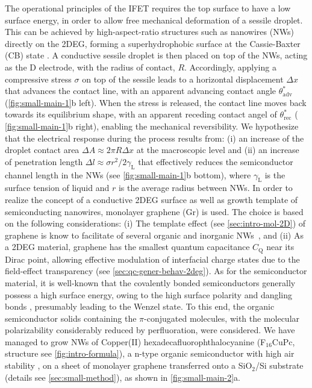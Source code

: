 The operational principles of the IFET requires the top surface to
have a low surface energy, in order to allow free mechanical
deformation of a sessile droplet.
%
This can be achieved by high-aspect-ratio structures such as nanowires (NWs)~\cite{Yang_2010_rev_NW} directly on the 2DEG,
forming a superhydrophobic surface at the Cassie-Baxter (CB) state
\cite{Cassie_1944_wet}.
%
A conductive sessile droplet is then placed on top
of the NWs, acting as the D electrode, with the radius of contact,
\(R\).
%
Accordingly, applying a compressive stress \(\sigma\) on top
of the sessile leads to a horizontal displacement \(\Delta x\) that
advances the contact line, with an apparent advancing contact angle
\(\theta_{\mathrm{adv}}^{*}\) (\autoref{fig:small-main-1}b left).
%
When the
stress is released, the contact line moves back towards its
equilibrium shape, with an apparent receding contact angel of
\(\theta_{\mathrm{rec}}^{*}\) ( \autoref{fig:small-main-1}b right), enabling the
mechanical reversibility.
%
We hypothesize that the electrical response during the
process results from: (i) an increase of the droplet contact area
\(\Delta A \approx 2 \pi R \Delta x\) at the macroscopic level and (ii)
an increase of penetration length \(\Delta l \approx \sigma
r^{2}/2\gamma_{\mathrm{L}}\) that effectively reduces the semiconductor
channel length in the NWs (see  \autoref{fig:small-main-1}b bottom), where
\(\gamma_{\mathrm{L}}\) is the surface tension of liquid and \(r\) is the
average radius between NWs.
%
In order to realize the concept of a conductive 2DEG surface as well
as growth template of semiconducting nanowires, monolayer graphene (Gr) is used.
%
The choice is based on the following considerations: (i) The template
effect (see \autoref{sec:intro-mol-2D}) of graphene is know to
facilitate of several organic and inorganic
NWs~\cite{Huang_2016_laury_nanowire_gr,Wang_2015_vertical_nanowire_gr,Fu_2012_gr_ZnONW},
and (ii) As a 2DEG material, graphene has the smallest quantum
capacitance $C_{\mathrm{Q}}$ near its Dirac point, allowing effective
modulation of interfacial charge states due to the field-effect
transparency (see \autoref{sec:qc-gener-behav-2deg}).
%
As for the semiconductor material, it is well-known
that the covalently bonded semiconductors generally possess a high
surface energy, owing to the high surface polarity
\cite{Azimi_2013_wetting_RO} and dangling bonds
\cite{Zhang_2004_dangling}, presumably leading to the Wenzel state.
%
To
this end, the organic semiconductor solids containing the
\(\pi\)-conjugated molecules, with the molecular polarizability
considerably reduced by perfluoration, were considered.
%
We have managed to grow NWs of Copper(II) hexadecafluorophthalocyanine
(F\(_{\text{16}}\)CuPc, structure see \autoref{fig:intro-formula}), a
n-type organic semiconductor with high air stability
\cite{Bao_1998_FCuPC}, on a sheet of monolayer graphene transferred
onto a SiO\(_{\text{2}}\)/Si substrate (details see
\autoref{sec:small-method}), as shown in \autoref{fig:small-main-2}a.

